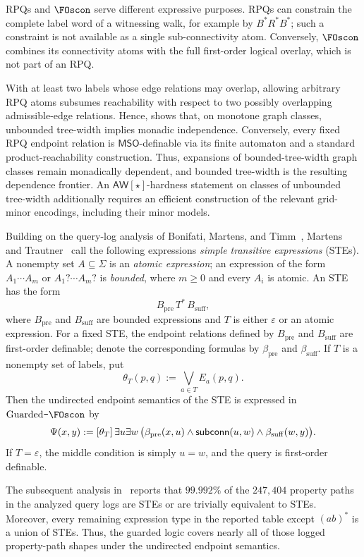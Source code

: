 \documentclass[1p,number,11pt]{elsarticle}
\newcommand{\scon}{\hbox{\sf subconn}}
\newcommand{\GFOscon}{\textup{Guarded}\raisebox{0.4pt}{\texttt{-}}\FOscon}
\theoremstyle{plain}
\newcommand{\MSO}{\ensuremath{\mathsf{MSO}}}
\renewcommand{\geq}{\geqslant}
\begin{document}
RPQs and $\FOscon$ serve different expressive purposes. RPQs can constrain
the complete label word of a witnessing walk, for example by
$B^\ast R^\ast B^\ast$; such a constraint is not available as a single
sub-connectivity atom. Conversely, $\FOscon$ combines its connectivity atoms
with the full first-order logical overlay, which is not part of an RPQ.

With at least two labels whose edge relations may overlap, allowing arbitrary
RPQ atoms subsumes reachability with respect to two possibly overlapping
admissible-edge relations. Hence,  shows that,
on monotone graph classes, unbounded tree-width implies monadic independence.
Conversely, every fixed RPQ endpoint relation is $\MSO$-definable via its finite
automaton and a standard product-reachability construction. Thus, expansions
of bounded-tree-width graph classes remain monadically dependent, and bounded
tree-width is the resulting dependence frontier. An
$\mathsf{AW}[\star]$-hardness statement on classes of unbounded tree-width
additionally requires an efficient construction of the relevant grid-minor
encodings, including their minor models.

Building on the query-log analysis of Bonifati, Martens, and
Timm~\cite{bonifati2020analytical}, Martens and
Trautner~\cite[Definition~2]{martens2019bridging} call the following
expressions \emph{simple transitive expressions} (STEs). A nonempty set
$A\subseteq\Sigma$ is an \emph{atomic
expression}; an expression of the form $A_1\cdots A_m$ or
$A_1?\cdots A_m?$ is \emph{bounded}, where $m\geq0$ and every $A_i$ is
atomic. An STE has the form
\[
   B_{\mathrm{pre}}\,T^\ast\,B_{\mathrm{suff}},
\]
where $B_{\mathrm{pre}}$ and $B_{\mathrm{suff}}$ are bounded expressions and
$T$ is either $\varepsilon$ or an atomic expression. For a fixed STE, the
endpoint relations defined by $B_{\mathrm{pre}}$ and $B_{\mathrm{suff}}$ are
first-order definable; denote the corresponding formulas by
$\beta_{\mathrm{pre}}$ and $\beta_{\mathrm{suff}}$. If $T$ is a nonempty
set of labels, put
\[
   \theta_T(p,q):=\bigvee_{a\in T}E_a(p,q).
\]
Then the undirected endpoint semantics of the STE is expressed in
$\GFOscon$ by
\[
   \Psi(x,y)
   :=
   [\theta_T]\,
   \exists u\exists w\,
   \bigl(
      \beta_{\mathrm{pre}}(x,u)
      \wedge \scon(u,w)
      \wedge \beta_{\mathrm{suff}}(w,y)
   \bigr).
\]
If $T=\varepsilon$, the middle condition is simply $u=w$, and the query is
first-order definable.

The subsequent analysis in~\cite{martens2019bridging} reports that $99.992\%$
of the $247{,}404$ property paths in the analyzed query logs are STEs or are
trivially equivalent to STEs. Moreover, every remaining expression type in the reported table
except $(ab)^\ast$ is a union of STEs. Thus, the guarded logic covers nearly
all of those logged property-path shapes under the undirected endpoint
semantics.
\end{document}
